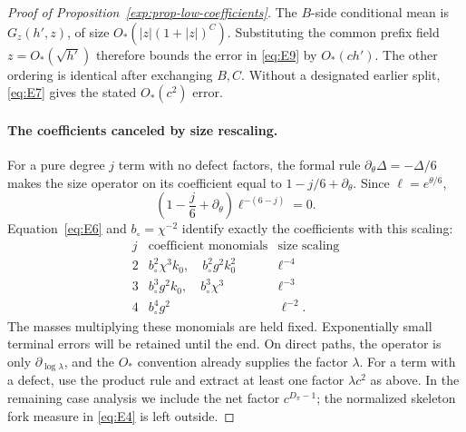 \begin{proof}[Proof of Proposition~\ref{exp:prop-low-coefficients}]
The \(B\)-side conditional mean is \(G_z(h',z)\), of size
\(O_*(|z|(1+|z|)^C)\). Substituting the common prefix field
\(z=O_*(\sqrt{h'})\) therefore bounds the error in \eqref{eq:E9}
by \(O_*(ch')\). The other ordering is identical after exchanging
\(B,C\). Without a designated earlier split, \eqref{eq:E7} gives
the stated \(O_*(c^2)\) error.

\paragraph{The coefficients canceled by size rescaling.}
For a pure degree \(j\) term with no defect factors, the formal
rule \(\partial_\theta\Delta=-\Delta/6\) makes the size operator on
its coefficient equal to \(1-j/6+\partial_\theta\). Since
\(\ell=e^{\theta/6}\),
\[
 \left(1-\frac j6+\partial_\theta\right)
       \ell^{-(6-j)}=0.
\]
Equation~\eqref{eq:E6} and \(b_\circ=\chi^{-2}\) identify exactly
the coefficients with this scaling:
\[
\begin{array}{c|c|c}
 j&\text{coefficient monomials}&\text{size scaling}\\ \hline
 2&b_\circ^2\chi^3k_0,\quad b_\circ^2g^2k_0^2&\ell^{-4}\\
 3&b_\circ^3g^2k_0,\quad b_\circ^3\chi^3&\ell^{-3}\\
 4&b_\circ^4g^2&\ell^{-2}.
\end{array}
\]
The masses multiplying these monomials are held fixed. Exponentially
small terminal errors will be retained until the end. On direct
paths, the operator is only \(\partial_{\log\lambda}\), and the
\(O_*\) convention already supplies the factor \(\lambda\).
For a term with a defect, use the product rule and extract at least
one factor \(\lambda c^2\) as above. In the remaining case analysis
we include the net factor \(c^{D_\pi-1}\); the normalized skeleton
fork measure in \eqref{eq:E4} is left outside.


\end{proof}
